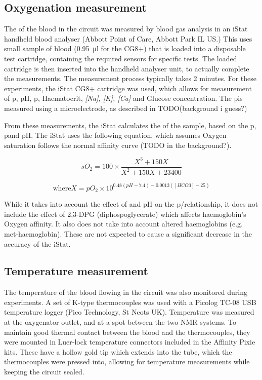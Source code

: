 \subsection{Oxygenation measurement}
The \SOtwo of the blood in the circuit was measured by blood gas analysis in an iStat handheld blood analyser (Abbott Point of Care, Abbott Park IL US.)
This uses small sample of blood (\SI{0.95}{\micro\litre} for the CG8+) that is loaded into a disposable test cartridge, containing the required sensors for specific tests.
The loaded cartridge is then inserted into the handheld analyser unit, to actually complete the measurements.
The measurement process typically takes 2 minutes.
For these experiments, the iStat CG8+ cartridge was used, which allows for measurement of p\Otwo, pH, p\COtwo, Haematocrit, \textit{[Na], [K], [Ca]} and Glucose concentration.
The p\Otwo is measured using a microelectrode, as described in TODO(background i guess?)

From these measurements, the iStat calculates the \SOtwo of the sample, based on the p\Otwo, p\COtwo and pH\cite{AbbottPointofCareCartridgeTestInformation2013}.
The iStat uses the following equation, which assumes Oxygen saturation follows the normal affinity curve  (TODO in the background?).

\begin{displaymath}
\mathit{sO_2} = 100 \times \frac{X^3 + 150X}{X^2 + 150X + 23400}
\end{displaymath}

\begin{displaymath}
\mathrm{where } X = \mathit{pO_2} \times 10^{0.48(\mathit{pH}-7.4) - 0.0013(\mathit{[HCO3]}-25)}
\end{displaymath}

While it takes into account the effect of \COtwo and pH on the p\Otwo/\SOtwo relationship, it does not include the effect of 2,3-DPG (diphospoglycerate) which affects haemoglobin's Oxygen affinity.
It also does not take into account altered haemoglobins (e.g. met-haemoglobin).
These are not expected to cause a significant decrease in the accuracy of the iStat.

\subsection{Temperature measurement}
The temperature of the blood flowing in the circuit was also monitored during experiments.
A set of K-type thermocouples was used with a Picolog TC-08 USB temperature logger (Pico Technology, St Neots UK).
Temperature was measured at the oxygenator outlet, and at a spot between the two NMR systems.
To maintain good thermal contact between the blood and the thermocouples, they were mounted in Luer-lock temperature connectors included in the Affinity Pixie kits.
These have a hollow gold tip which extends into the tube, which the thermocouples were pressed into, allowing for temperature measurements while keeping the circuit sealed.

